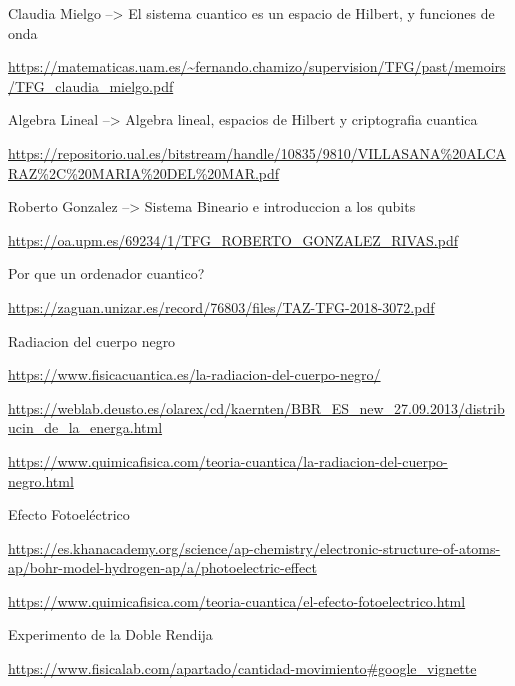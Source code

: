 \documentclass{article}
\numberwithin{equation}{section} %
\begin{document}
        Claudia Mielgo --> El sistema cuantico es un espacio de Hilbert, y funciones de onda\par
        \url{https://matematicas.uam.es/~fernando.chamizo/supervision/TFG/past/memoirs/TFG\_claudia\_mielgo.pdf}
        \vspace{2mm}

        Algebra Lineal --> Algebra lineal, espacios de Hilbert y criptografia cuantica\par
        \url{https://repositorio.ual.es/bitstream/handle/10835/9810/VILLASANA%20ALCARAZ%2C%20MARIA%20DEL%20MAR.pdf}
        \vspace{2mm}

        Roberto Gonzalez --> Sistema Bineario e introduccion a los qubits\par
        \url{https://oa.upm.es/69234/1/TFG\_ROBERTO\_GONZALEZ\_RIVAS.pdf}
        \vspace{2mm}

        Por que un ordenador cuantico?\par
        \url{https://zaguan.unizar.es/record/76803/files/TAZ-TFG-2018-3072.pdf}
        \vspace{2mm}

        Radiacion del cuerpo negro\par
        \url{https://www.fisicacuantica.es/la-radiacion-del-cuerpo-negro/}
        \vspace{2mm}

        \url{https://weblab.deusto.es/olarex/cd/kaernten/BBR_ES_new_27.09.2013/distribucin_de_la_energa.html}
        \vspace{2mm}

        \url{https://www.quimicafisica.com/teoria-cuantica/la-radiacion-del-cuerpo-negro.html}
        \vspace{2mm}

        Efecto Fotoeléctrico\par
        \url{https://es.khanacademy.org/science/ap-chemistry/electronic-structure-of-atoms-ap/bohr-model-hydrogen-ap/a/photoelectric-effect}
        \vspace{2mm}

        \url{https://www.quimicafisica.com/teoria-cuantica/el-efecto-fotoelectrico.html}
        \vspace{2mm}

        Experimento de la Doble Rendija\par
        \url{https://www.fisicalab.com/apartado/cantidad-movimiento#google_vignette}
        \vspace{2mm}
\end{document}
